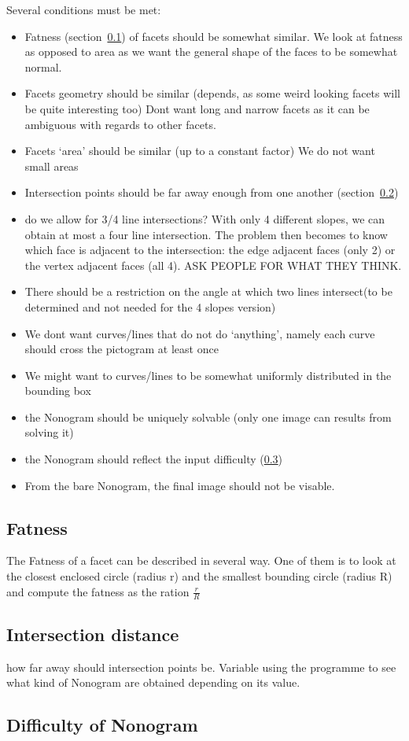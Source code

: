 \documentclass{article}
\begin{document}
Several conditions must be met:
\begin{itemize}
	\item Fatness (section~\ref{fatness}) of facets should be somewhat similar. We look at fatness as opposed to area as we want the general shape of the faces to be somewhat normal.
	\item Facets geometry should be similar (depends, as some weird looking facets will be quite interesting too) Dont want long and narrow facets as it can be ambiguous with regards to other facets.
	\item Facets `area' should be similar (up to a constant factor) We do not want small areas
	\item Intersection points should be far away enough from one another (section~\ref{intersection})
	\item do we allow for 3/4 line intersections? With only 4 different slopes, we can obtain at most a four line intersection. The problem then becomes to know which face is adjacent to the intersection: the edge adjacent faces (only 2) or the vertex adjacent faces (all 4). ASK PEOPLE FOR WHAT THEY THINK.
	\item There should be a restriction on the angle at which two lines intersect(to be determined and not needed for the 4 slopes version)
	\item We dont want curves/lines that do not do `anything', namely each curve should cross the pictogram at least once
	\item We might want to curves/lines to be somewhat uniformly distributed in the bounding box
	\item the Nonogram should be uniquely solvable (only one image can results from solving it)
	\item the Nonogram should reflect the input difficulty (\ref{difficulty})
	\item From the bare Nonogram, the final image should not be visable.
\end{itemize}


\subsection{Fatness}
\label{fatness}
The Fatness of a facet can be described in several way. One of them is to look at the closest enclosed circle (radius r) and the smallest bounding circle (radius R) and compute the fatness as the ration $\frac{r}{R}$

\subsection{Intersection distance}
\label{intersection}
how far away should intersection points be. Variable using the programme to see what kind of Nonogram are obtained depending on its value.

\subsection{Difficulty of Nonogram}
\label{difficulty}
\end{document}
